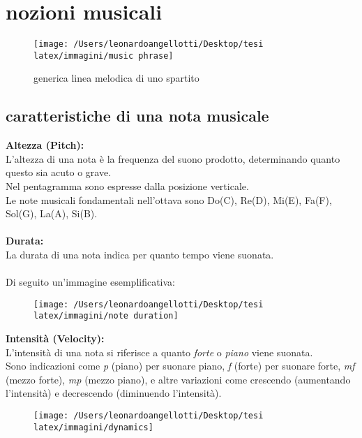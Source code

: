 \documentclass[a4paper,12pt]{report}
\begin{document}
\section{nozioni musicali}

\begin{figure}[H]
    \centering
    \texttt{[image: /Users/leonardoangellotti/Desktop/tesi latex/immagini/music phrase]} 
    \caption{generica linea melodica di uno spartito}
    \label{fig:immagine3}
\end{figure}

\subsection{caratteristiche di una nota musicale}

\textbf{Altezza (Pitch):} \\
L'altezza di una nota è la frequenza del suono prodotto, determinando quanto questo sia acuto o grave. \\
Nel pentagramma sono espresse  dalla posizione verticale. \\
Le note musicali fondamentali nell'ottava sono Do(C), Re(D), Mi(E), Fa(F), Sol(G), La(A), Si(B). \\
\\
\textbf{Durata:}\\
La durata di una nota indica per quanto tempo viene suonata. \\
\\
Di seguito un'immagine esemplificativa:

\begin{figure}[H]
    \centering
    \texttt{[image: /Users/leonardoangellotti/Desktop/tesi latex/immagini/note duration]} 
    \label{fig:immagine4}
\end{figure}

\textbf{Intensità (Velocity):} \\
L'intensità di una nota si riferisce a quanto \textit{forte} o \textit{piano} viene suonata. \\
Sono indicazioni come \textit{p} (piano) per suonare piano, \textit{f} (forte) per suonare forte, \textit{mf} (mezzo forte), \textit{mp} (mezzo piano), e altre variazioni come crescendo (aumentando l'intensità) e decrescendo (diminuendo l'intensità).

\begin{figure}[H]
    \centering
    \texttt{[image: /Users/leonardoangellotti/Desktop/tesi latex/immagini/dynamics]} 
    \label{fig:immagine5}
\end{figure}
\end{document}
